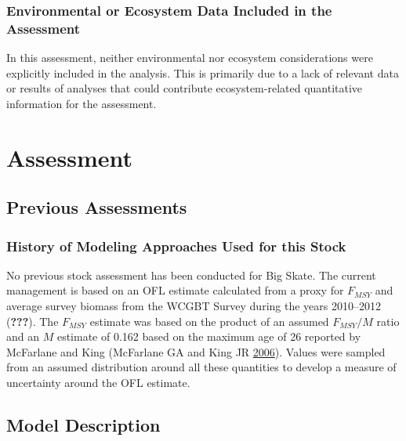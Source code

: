 \documentclass[12pt,]{article}
\begin{document}
\vspace{.5cm}

\hypertarget{environmental-or-ecosystem-data-included-in-the-assessment}{%
\subsubsection{Environmental or Ecosystem Data Included in the
Assessment}\label{environmental-or-ecosystem-data-included-in-the-assessment}}

In this assessment, neither environmental nor ecosystem considerations
were explicitly included in the analysis. This is primarily due to a
lack of relevant data or results of analyses that could contribute
ecosystem-related quantitative information for the assessment.

\newpage

\hypertarget{assessment}{%
\section{Assessment}\label{assessment}}

\hypertarget{previous-assessments}{%
\subsection{Previous Assessments}\label{previous-assessments}}

\hypertarget{history-of-modeling-approaches-used-for-this-stock}{%
\subsubsection{History of Modeling Approaches Used for this
Stock}\label{history-of-modeling-approaches-used-for-this-stock}}

No previous stock assessment has been conducted for Big Skate. The
current management is based on an OFL estimate calculated from a proxy
for \(F_{MSY}\) and average survey biomass from the WCGBT Survey during
the years 2010--2012 ({\textbf{???}}). The \(F_{MSY}\) estimate was
based on the product of an assumed \(F_{MSY}/M\) ratio and an \(M\)
estimate of 0.162 based on the maximum age of 26 reported by McFarlane
and King (McFarlane GA and King JR
\protect\hyperlink{ref-McFandKing2006}{2006}). Values were sampled from
an assumed distribution around all these quantities to develop a measure
of uncertainty around the OFL estimate.

\hypertarget{model-description}{%
\subsection{Model Description}\label{model-description}}
\end{document}
